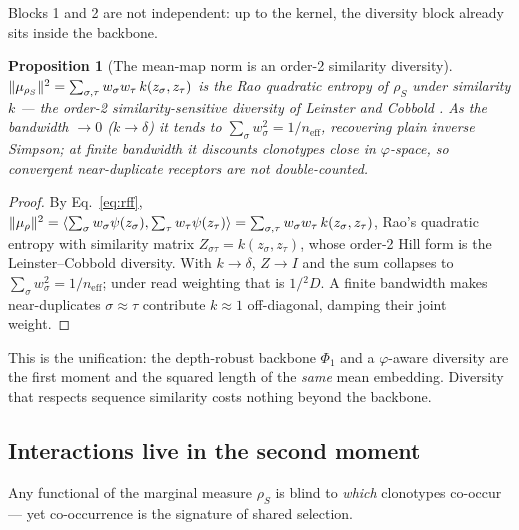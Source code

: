 \documentclass[11pt]{article}
\theoremstyle{oldplain}
\newtheorem{proposition}{Proposition}
\theoremstyle{oldrem}
\DeclarePairedDelimiter{\norm}{\lVert}{\rVert}
\begin{document}
Blocks 1 and 2 are not independent: up to the kernel, the diversity block already sits inside the backbone.

\begin{proposition}[The mean-map norm is an order-2 similarity diversity]\label{prop:simdiv}
$\norm{\mu_{\rho_S}}^2=\sum_{\sigma,\tau}w_\sigma w_\tau\,k(z_\sigma,z_\tau)$ is the Rao quadratic entropy of
$\rho_S$ under similarity $k$ --- the order-2 similarity-sensitive diversity of Leinster and Cobbold
\cite{LeinsterCobbold2012}. As the bandwidth $\to0$ ($k\to\delta$) it tends to $\sum_\sigma w_\sigma^2
=1/n_{\mathrm{eff}}$, recovering plain inverse Simpson; at finite bandwidth it discounts clonotypes close in
$\varphi$-space, so convergent near-duplicate receptors are not double-counted.
\end{proposition}
\begin{proof}
By Eq.~\eqref{eq:rff}, $\norm{\mu_\rho}^2=\langle\sum_\sigma w_\sigma\psi(z_\sigma),\sum_\tau
w_\tau\psi(z_\tau)\rangle=\sum_{\sigma,\tau}w_\sigma w_\tau\,k(z_\sigma,z_\tau)$, Rao's quadratic entropy with
similarity matrix $Z_{\sigma\tau}=k(z_\sigma,z_\tau)$, whose order-2 Hill form is the Leinster--Cobbold
diversity. With $k\to\delta$, $Z\to I$ and the sum collapses to $\sum_\sigma w_\sigma^2=1/n_{\mathrm{eff}}$;
under read weighting that is $1/{}^2D$. A finite bandwidth makes near-duplicates $\sigma\approx\tau$ contribute
$k\approx1$ off-diagonal, damping their joint weight. \end{proof}

This is the unification: the depth-robust backbone $\Phi_1$ and a $\varphi$-aware diversity are the first moment
and the squared length of the \emph{same} mean embedding. Diversity that respects sequence similarity costs
nothing beyond the backbone.

\subsection{Interactions live in the second moment}\label{sec:samp-interact}

Any functional of the marginal measure $\rho_S$ is blind to \emph{which} clonotypes co-occur --- yet
co-occurrence is the signature of shared selection.
\end{document}
